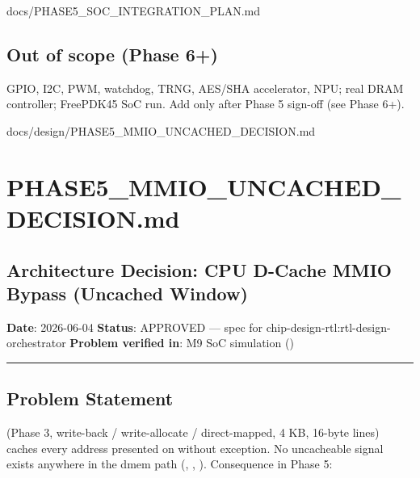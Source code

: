 \begin{relocated}{docs/PHASE5_SOC_INTEGRATION_PLAN.md}
\subsection{Out of scope (Phase 6+)}\label{ds:ch:phase5-soc-integration-plan:8-out-of-scope-phase-6}

GPIO, I2C, PWM, watchdog, TRNG, AES/SHA accelerator, NPU; real DRAM
controller; FreePDK45 SoC run. Add only after Phase 5 sign-off (see
 Phase 6+).
\end{relocated}

\begin{relocated}{docs/design/PHASE5_MMIO_UNCACHED_DECISION.md}
\section{\texorpdfstring{PHASE5\_\allowbreak{}MMIO\_\allowbreak{}UNCACHED\_\allowbreak{}DECISION.md}{\cref{ds:dec:phase5-mmio-uncached}}}\label{ds:dec:phase5-mmio-uncached}

\subsection{Architecture Decision: CPU D-Cache MMIO Bypass (Uncached
Window)}\label{ds:dec:phase5-mmio-uncached:architecture-decision-cpu-d-cache-mmio-bypass-uncached-window}

\textbf{Date}: 2026-06-04 \textbf{Status}: APPROVED --- spec for
chip-design-rtl:rtl-design-orchestrator \textbf{Problem verified in}: M9
SoC simulation ()

\begin{center}\rule{0.5\linewidth}{0.5pt}\end{center}

\subsection{Problem Statement}\label{ds:dec:phase5-mmio-uncached:1-problem-statement}

 (Phase 3, write-back / write-allocate /
direct-mapped, 4 KB, 16-byte lines) caches every address presented on
 without exception. No uncacheable signal exists
anywhere in the dmem path (,
, ).
Consequence in Phase 5:


\end{relocated}
